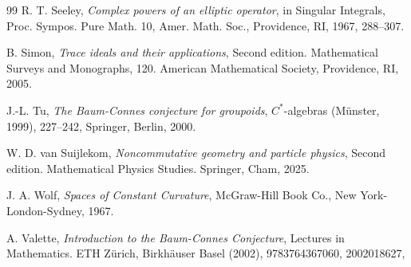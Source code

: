 \documentclass[a4paper,reqno]{amsart}
\numberwithin{equation}{section}
\theoremstyle{definition}
\theoremstyle{remark}
\begin{document}
\begin{thebibliography}{99}
 R. T. Seeley, \emph{Complex powers of an elliptic operator}, in Singular Integrals, Proc. Sympos. Pure Math. 10, Amer. Math. Soc., Providence, RI, 1967, 288--307.

 B. Simon, \emph{Trace ideals and their applications}, Second edition. Mathematical Surveys and Monographs, 120. American Mathematical Society, Providence, RI, 2005.

 J.-L. Tu, \emph{The Baum-Connes conjecture for groupoids}, $C^*$-algebras (Münster, 1999), 227--242, Springer, Berlin, 2000.


 W. D. van Suijlekom, \emph{Noncommutative geometry and particle physics}, Second edition. Mathematical Physics Studies. Springer, Cham, 2025.

 J. A. Wolf, \emph{Spaces of Constant Curvature},  McGraw-Hill Book Co., New York-London-Sydney,
1967.

 A. Valette, \emph{Introduction to the Baum-Connes Conjecture},  Lectures in Mathematics. ETH Z{\"u}rich,  Birkh{\"a}user Basel (2002), 9783764367060, 2002018627,
 

\end{thebibliography}
\end{document}
